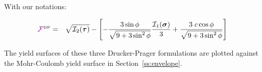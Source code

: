 With our notations:

\begin{eqnarray}
{\color{violet}\cal F}^{\text{\tiny DP}}
&=& \sqrt{{\cal I}_2({\bm \tau})} 
- \left[ -\frac{3 \sin\phi}{\sqrt{9+3\sin^2\phi} }  \frac{{\cal I}_1({\bm \sigma})}{3}
+ \frac{ 3\; c \cos \phi }{ \sqrt{9+3\sin^2\phi} } \right] \label{eq:dp3}
\end{eqnarray}

The yield surfaces of these three Drucker-Prager formulations are plotted against the Mohr-Coulomb
yield surface in Section~\ref{ss:envelope}. 









